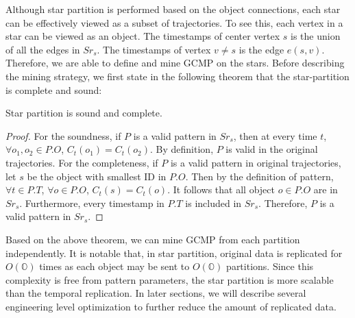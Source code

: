 Although star partition is performed based on the object connections, each star
can be effectively viewed as a subset of trajectories. To see this, each vertex
in a star can be viewed as an object. The timestamps of center vertex $s$ is the
union of all the edges in $Sr_s$. The timestamps of vertex $v \neq s$ is the 
edge $e(s,v)$. Therefore, we are able to define and mine GCMP on the stars. 
Before describing the mining strategy, we first state in the following theorem that 
the star-partition is complete and sound:
\begin{theorem}
Star partition is sound and complete.
\end{theorem}

\begin{proof}
For the soundness,
if $P$ is a valid pattern in $Sr_s$, then at every time $t$, $\forall o_1, o_2 \in P.O$, $C_t(o_1) = C_t(o_2)$.
By definition, $P$ is valid in the original trajectories.
For the completeness,
if $P$ is a valid pattern in original trajectories, let $s$ be the object with smallest ID in $P.O$. 
Then by the definition of pattern, $\forall t \in P.T$, $\forall o \in P.O$, $C_t(s) = C_t(o)$.
It follows that all object $o \in P.O$ are in $Sr_s$. Furthermore, every timestamp in $P.T$ is included
in $Sr_s$. Therefore, $P$ is a valid pattern in $Sr_s$.
\end{proof}

Based on the above theorem, we can mine GCMP from each partition independently.
It is notable that, in star partition, original data is replicated for $O(\mathbb{O})$ times
as each object may be sent to $O(\mathbb{O})$ partitions. Since this complexity is free
from pattern parameters, the star partition is more scalable than the temporal replication.
In later sections, we will describe several engineering level optimization to further reduce the amount of replicated data.

